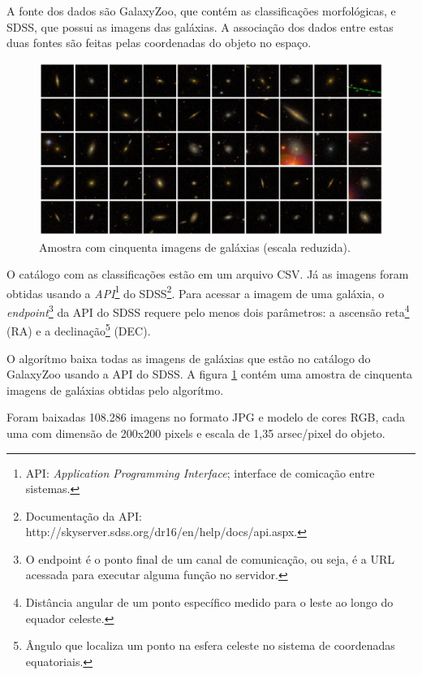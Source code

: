 A fonte dos dados são GalaxyZoo, que contém as classificações morfológicas, e SDSS, que possui as imagens das galáxias. A associação dos dados entre estas duas fontes são feitas pelas coordenadas do objeto no espaço.

\begin{figure}[h!]
  \centering
  \includegraphics[width=\textwidth]{figures/galaxy_grid.jpg}
  \caption{Amostra com cinquenta imagens de galáxias (escala reduzida).}
  \label{fig:galaxy_grid}
\end{figure}

O catálogo com as classificações estão em um arquivo CSV. Já as imagens foram obtidas usando a \emph{API}\footnote{API: \emph{Application Programming Interface}; interface de comicação entre sistemas.} do SDSS\footnote{Documentação da API: http://skyserver.sdss.org/dr16/en/help/docs/api.aspx.}. Para acessar a imagem de uma galáxia, o \emph{endpoint}\footnote{O endpoint é o ponto final de um canal de comunicação, ou seja, é a URL acessada para executar alguma função no servidor.} da API do SDSS requere pelo menos dois parâmetros: a ascensão reta\footnote{Distância angular de um ponto específico medido para o leste ao longo do equador celeste.} (RA) e a declinação\footnote{Ângulo que localiza um ponto na esfera celeste no sistema de coordenadas equatoriais.} (DEC).

O algorítmo baixa todas as imagens de galáxias que estão no catálogo do GalaxyZoo usando a API do SDSS. A figura \ref{fig:galaxy_grid} contém uma amostra de cinquenta imagens de galáxias obtidas pelo algorítmo.

Foram baixadas 108.286 imagens no formato JPG e modelo de cores RGB, cada uma com dimensão de 200x200 pixels e escala de 1,35 arsec/pixel do objeto.

